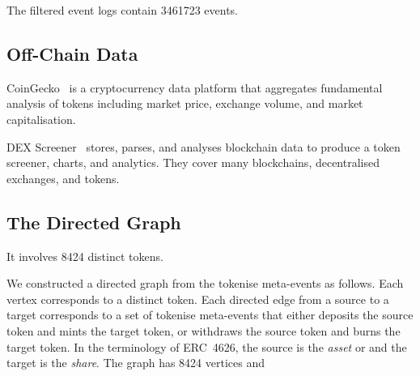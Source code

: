 The filtered event logs contain \num{3461723} events.

\subsection{Off-Chain Data}\label{sec:data-off-chain}

CoinGecko~\cite{gecko-labs-xx} is a cryptocurrency data platform that
aggregates fundamental analysis of tokens including market price,
exchange volume, and market capitalisation.

DEX Screener~\cite{dex-screener-xx} stores, parses, and analyses
blockchain data to produce a token screener, charts, and analytics.
They cover many blockchains, decentralised exchanges, and tokens.

\subsection{The Directed Graph}\label{sec:data-directed-graph}

It involves \num{8424} distinct tokens.

We constructed a directed graph from the tokenise meta-events as
follows.  Each vertex corresponds to a distinct token.  Each directed
edge from a source to a target corresponds to a set of tokenise
meta-events that either deposits the source token and mints the target
token, or withdraws the source token and burns the target token.  In
the terminology of {ERC}~4626, the source is the \textit{asset} or and
the target is the \textit{share}.  The graph has 8424 vertices and
